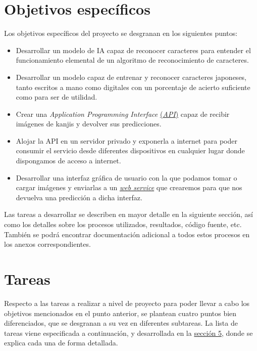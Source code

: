 \documentclass{article}
\begin{document}
\newpage

\section{Objetivos específicos}
\label{sec:Objectives}

Los objetivos específicos del proyecto se desgranan en los siguientes puntos:

\begin{itemize}
	\item Desarrollar un modelo de IA capaz de reconocer caracteres para entender el funcionamiento elemental de un algoritmo de reconocimiento de caracteres.
	\item Desarrollar un modelo capaz de entrenar y reconocer caracteres japoneses, tanto escritos a mano como digitales con un porcentaje de acierto suficiente como para ser de utilidad.
	\item Crear una \textit{Application Programming Interface} \hyperref[sec:terms]{(\textit{API}\tec)} capaz de recibir imágenes de kanjis y devolver sus predicciones.
	\item Alojar la API en un servidor privado y exponerla a internet para poder consumir el servicio desde diferentes dispositivos en cualquier lugar donde dispongamos de acceso a internet.
	\item Desarrollar una interfaz gráfica de usuario con la que podamos tomar o cargar imágenes y enviarlas a un \hyperref[sec:terms]{\textit{web service}\tec} que crearemos para que nos devuelva una predicción a dicha interfaz.
\end{itemize}

Las tareas a desarrollar se describen en mayor detalle en la siguiente sección, así como los detalles sobre los procesos utilizados, resultados, código fuente, etc. También se podrá encontrar documentación adicional a todos estos procesos en los anexos correspondientes.



\section{Tareas}
\label{sec:Tasks}

Respecto a las tareas a realizar a nivel de proyecto para poder llevar a cabo los objetivos mencionados en el punto anterior, se plantean cuatro puntos bien diferenciados, que se desgranan a su vez en diferentes subtareas. La lista de tareas viene especificada a continuación, y desarrollada en la \hyperref[sec:Development]{sección 5}, donde se explica cada una de forma detallada.
\end{document}
